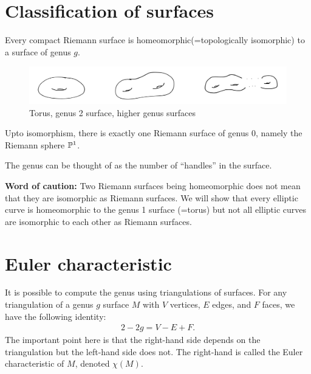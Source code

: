 \documentclass{amsart}
\begin{document}
\section*{Classification of surfaces}

\begin{theorem}
  Every compact Riemann surface is homeomorphic(=topologically isomorphic) to a surface of genus $g$.
  \begin{figure}[H]
    \centering \includegraphics[width=0.85\linewidth]{images/GegusGSurfaces}
    \caption{Torus, genus 2 surface, higher genus surfaces}
  \end{figure}
  Upto isomorphism, there is exactly one Riemann surface of genus 0, namely the Riemann sphere $\mathbb{P}^1$.
\end{theorem}

The genus can be thought of as the number of ``handles'' in the surface.

\textbf{Word of caution:} Two Riemann surfaces being homeomorphic does not mean that they are isomorphic as Riemann surfaces.
We will show that every elliptic curve is homeomorphic to the genus 1 surface (=torus) but not all elliptic curves are isomorphic to each other as Riemann surfaces.








\section*{Euler characteristic}
  It is possible to compute the genus using triangulations of surfaces.
  For any triangulation of a genus $g$ surface $M$ with $V$ vertices, $E$ edges, and $F$ faces, we have the following identity:
  \begin{align*}
    2 - 2g = V - E + F.
  \end{align*}
  The important point here is that the right-hand side depends on the triangulation but the left-hand side does not. The right-hand is called the Euler characteristic of $M$, denoted $\chi(M)$.
\end{document}

